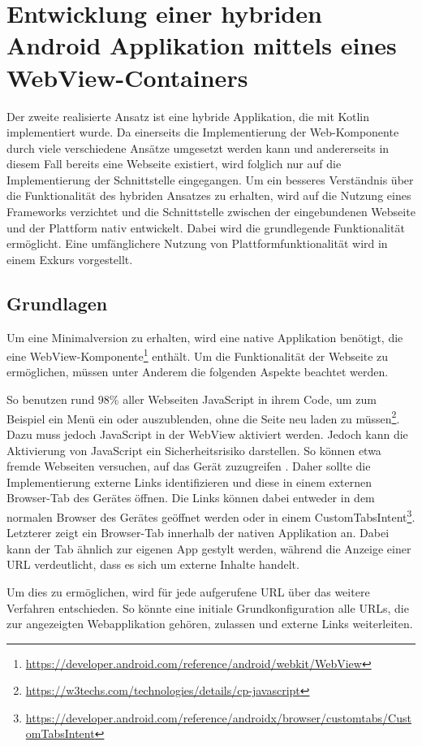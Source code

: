 \section{Entwicklung einer hybriden Android Applikation mittels eines WebView-Containers}
Der zweite realisierte Ansatz ist eine hybride Applikation, die mit Kotlin implementiert wurde. 
Da einerseits die Implementierung der Web-Komponente durch viele verschiedene Ansätze umgesetzt werden kann und andererseits in diesem Fall bereits eine Webseite existiert, wird folglich nur auf die Implementierung der Schnittstelle eingegangen. 
Um ein besseres Verständnis über die Funktionalität des hybriden Ansatzes zu erhalten, wird auf die Nutzung eines Frameworks verzichtet und die Schnittstelle zwischen der eingebundenen Webseite und der Plattform nativ entwickelt.
Dabei wird die grundlegende Funktionalität ermöglicht. Eine umfänglichere Nutzung von Plattformfunktionalität wird in einem Exkurs vorgestellt.

\subsection{Grundlagen}
Um eine Minimalversion zu erhalten, wird eine native Applikation benötigt, die eine WebView-Komponente\footnote{\url{https://developer.android.com/reference/android/webkit/WebView}} enthält. Um die Funktionalität der Webseite zu ermöglichen, müssen unter Anderem die folgenden Aspekte beachtet werden.

So benutzen rund 98\% aller Webseiten JavaScript in ihrem Code, um zum Beispiel ein Menü ein oder auszublenden, ohne die Seite neu laden zu müssen\footnote{\url{https://w3techs.com/technologies/details/cp-javascript}}. 
Dazu muss jedoch JavaScript in der WebView aktiviert werden. 
Jedoch kann die Aktivierung von JavaScript ein Sicherheitsrisiko darstellen. So können etwa fremde Webseiten versuchen, auf das Gerät zuzugreifen \cite{webview_javascript_security}. 
Daher sollte die Implementierung externe Links identifizieren und diese in einem externen Browser-Tab des Gerätes öffnen.
Die Links können dabei entweder in dem normalen Browser des Gerätes geöffnet werden oder in einem CustomTabsIntent\footnote{\url{https://developer.android.com/reference/androidx/browser/customtabs/CustomTabsIntent}}.
Letzterer zeigt ein Browser-Tab innerhalb der nativen Applikation an. Dabei kann der Tab ähnlich zur eigenen App gestylt werden, während die Anzeige einer URL verdeutlicht, dass es sich um externe Inhalte handelt.

Um dies zu ermöglichen, wird für jede aufgerufene URL über das weitere Verfahren entschieden. So könnte eine initiale Grundkonfiguration alle URLs, die zur angezeigten Webapplikation gehören, zulassen und externe Links weiterleiten.

